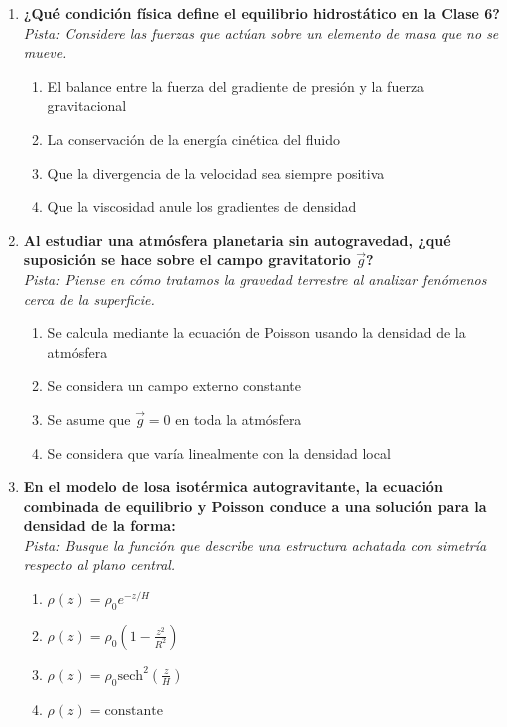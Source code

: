 \documentclass[12pt,a4paper]{article}
\begin{document}
\begin{enumerate}[label=\textbf{\arabic*.}, itemsep=1.5em]
\item \textbf{¿Qué condición física define el equilibrio hidrostático en la Clase 6?} \\
\textit{Pista: Considere las fuerzas que actúan sobre un elemento de masa que no se mueve.}
\begin{enumerate}[label=\alph*), leftmargin=*]
    \item El balance entre la fuerza del gradiente de presión y la fuerza gravitacional
    \item La conservación de la energía cinética del fluido
    \item Que la divergencia de la velocidad sea siempre positiva
    \item Que la viscosidad anule los gradientes de densidad
\end{enumerate}

\item \textbf{Al estudiar una atmósfera planetaria sin autogravedad, ¿qué suposición se hace sobre el campo gravitatorio $\vec{g}$?} \\
\textit{Pista: Piense en cómo tratamos la gravedad terrestre al analizar fenómenos cerca de la superficie.}
\begin{enumerate}[label=\alph*), leftmargin=*]
    \item Se calcula mediante la ecuación de Poisson usando la densidad de la atmósfera
    \item Se considera un campo externo constante
    \item Se asume que $\vec{g} = 0$ en toda la atmósfera
    \item Se considera que varía linealmente con la densidad local
\end{enumerate}

\item \textbf{En el modelo de losa isotérmica autogravitante, la ecuación combinada de equilibrio y Poisson conduce a una solución para la densidad de la forma:} \\
\textit{Pista: Busque la función que describe una estructura achatada con simetría respecto al plano central.}
\begin{enumerate}[label=\alph*), leftmargin=*]
    \item $\rho(z) = \rho_0 e^{-z/H}$
    \item $\rho(z) = \rho_0 \left(1 - \frac{z^2}{R^2}\right)$
    \item $\rho(z) = \rho_0 \text{sech}^2\left(\frac{z}{H}\right)$
    \item $\rho(z) = \text{constante}$
\end{enumerate}


\end{enumerate}
\end{document}
